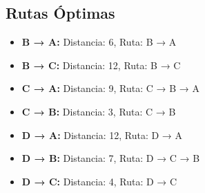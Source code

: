 \documentclass[12pt]{article}
\begin{document}
\clearpage
\subsection{Rutas Óptimas}
\begin{itemize}
\item \textbf{B → A:} Distancia: 6, Ruta: B → A
\item \textbf{B → C:} Distancia: 12, Ruta: B → C
\item \textbf{C → A:} Distancia: 9, Ruta: C → B → A
\item \textbf{C → B:} Distancia: 3, Ruta: C → B
\item \textbf{D → A:} Distancia: 12, Ruta: D → A
\item \textbf{D → B:} Distancia: 7, Ruta: D → C → B
\item \textbf{D → C:} Distancia: 4, Ruta: D → C
\end{itemize}
\end{document}
